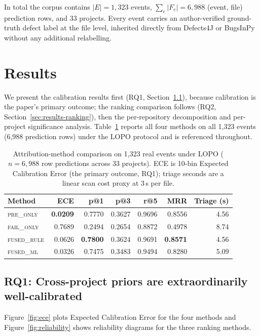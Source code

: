 \documentclass[preprint,12pt]{elsarticle}
\begin{document}
In total the corpus contains $|E| = 1{,}323$ events, $\sum_e |F_e| = 6{,}988$ (event, file) prediction rows, and 33 projects. Every event carries an author-verified ground-truth defect label at the file level, inherited directly from Defects4J or BugsInPy without any additional relabelling.

\section{Results}
\label{sec:results}

We present the calibration results first (RQ1, Section~\ref{sec:results-calibration}), because calibration is the paper's primary outcome; the ranking comparison follows (RQ2, Section~\ref{sec:results-ranking}), then the per-repository decomposition and per-project significance analysis. Table~\ref{tab:headline} reports all four methods on all 1{,}323 events (6{,}988 prediction rows) under the LOPO protocol and is referenced throughout.

\begin{table}[!ht]
\centering
\caption{Attribution-method comparison on 1{,}323 real events under LOPO ($n = 6{,}988$ row predictions across 33 projects). ECE is 10-bin Expected Calibration Error (the primary outcome, RQ1); triage seconds are a linear scan cost proxy at 3\,s per file.}
\label{tab:headline}
\small
\begin{tabular}{lrrrrrr}
\toprule
Method             & ECE     & p@1    & p@3    & r@5    & MRR    & Triage (s) \\
\midrule
\textsc{pre\_only}   & \textbf{0.0209} & 0.7770 & 0.3627 & 0.9696 & 0.8556 & 4.56 \\
\textsc{fail\_only}  & 0.7689 & 0.2494 & 0.2654 & 0.8872 & 0.4978 & 8.74 \\
\textsc{fused\_rule} & 0.0626 & \textbf{0.7800} & 0.3624 & 0.9691 & \textbf{0.8571} & 4.56 \\
\textsc{fused\_ml}   & 0.0326 & 0.7475 & 0.3483 & 0.9494 & 0.8280 & 5.09 \\
\bottomrule
\end{tabular}
\end{table}

\subsection{RQ1: Cross-project priors are extraordinarily well-calibrated}
\label{sec:results-calibration}

Figure~\ref{fig:ece} plots Expected Calibration Error for the four methods and Figure~\ref{fig:reliability} shows reliability diagrams for the three ranking methods.
\end{document}
